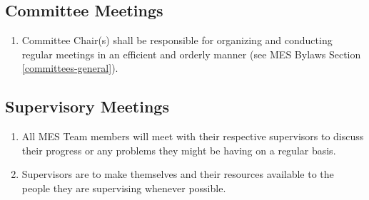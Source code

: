 \subsection{Committee Meetings}
\label{committee-meetings}
\begin{enumerate}
 \item
  Committee Chair(s) shall be responsible for organizing and conducting regular meetings in an efficient and orderly manner (see MES Bylaws Section \ref{committees-general}).

\end{enumerate}

\subsection{Supervisory Meetings}
\label{supervisory-meetings}
\begin{enumerate}
 \item
  All MES Team members will meet with their respective supervisors to discuss their progress or any problems they might be having on a regular basis.
 \item
  Supervisors are to make themselves and their resources available to the people they are supervising whenever possible.
\end{enumerate}
